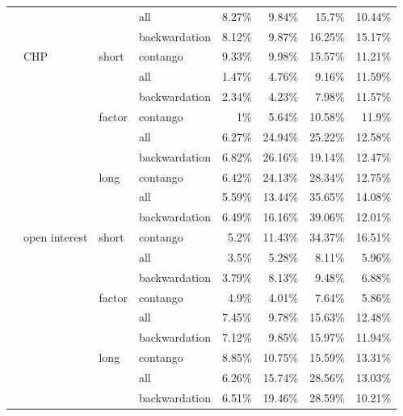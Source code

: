 \documentclass[]{elsarticle} %
\begin{document}
\begin{longtable}[t]{>{}llllrrrr}
\nopagebreak
 &  &  & all & 8.27\% & 9.84\% & 15.7\% & 10.44\%\\
\nopagebreak
 &  &  & backwardation & 8.12\% & 9.87\% & 16.25\% & 15.17\%\\
\nopagebreak
 & \multirow[t]{-9}{*}{\raggedright\arraybackslash CHP} & \multirow[t]{-3}{*}{\raggedright\arraybackslash short} & contango & 9.33\% & 9.98\% & 15.57\% & 11.21\%\\
\nopagebreak
 &  &  & all & 1.47\% & 4.76\% & 9.16\% & 11.59\%\\
\nopagebreak
 &  &  & backwardation & 2.34\% & 4.23\% & 7.98\% & 11.57\%\\
\nopagebreak
 &  & \multirow[t]{-3}{*}{\raggedright\arraybackslash factor} & contango & 1\% & 5.64\% & 10.58\% & 11.9\%\\
\nopagebreak
 &  &  & all & 6.27\% & 24.94\% & 25.22\% & 12.58\%\\
\nopagebreak
 &  &  & backwardation & 6.82\% & 26.16\% & 19.14\% & 12.47\%\\
\nopagebreak
 &  & \multirow[t]{-3}{*}{\raggedright\arraybackslash long} & contango & 6.42\% & 24.13\% & 28.34\% & 12.75\%\\
\nopagebreak
 &  &  & all & 5.59\% & 13.44\% & 35.65\% & 14.08\%\\
\nopagebreak
 &  &  & backwardation & 6.49\% & 16.16\% & 39.06\% & 12.01\%\\
\nopagebreak
 & \multirow[t]{-9}{*}{\raggedright\arraybackslash open interest} & \multirow[t]{-3}{*}{\raggedright\arraybackslash short} & contango & 5.2\% & 11.43\% & 34.37\% & 16.51\%\\
\nopagebreak
 &  &  & all & 3.5\% & 5.28\% & 8.11\% & 5.96\%\\
\nopagebreak
 &  &  & backwardation & 3.79\% & 8.13\% & 9.48\% & 6.88\%\\
\nopagebreak
 &  & \multirow[t]{-3}{*}{\raggedright\arraybackslash factor} & contango & 4.9\% & 4.01\% & 7.64\% & 5.86\%\\
\nopagebreak
 &  &  & all & 7.45\% & 9.78\% & 15.63\% & 12.48\%\\
\nopagebreak
 &  &  & backwardation & 7.12\% & 9.85\% & 15.97\% & 11.94\%\\
\nopagebreak
 &  & \multirow[t]{-3}{*}{\raggedright\arraybackslash long} & contango & 8.85\% & 10.75\% & 15.59\% & 13.31\%\\
\nopagebreak
 &  &  & all & 6.26\% & 15.74\% & 28.56\% & 13.03\%\\
\nopagebreak
 &  &  & backwardation & 6.51\% & 19.46\% & 28.59\% & 10.21\%\\

\end{longtable}
\end{document}
